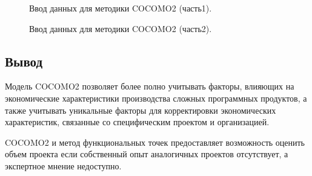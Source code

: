 \documentclass[a4paper,14pt]{article}
\begin{document}
\begin{figure}[!h]
         \caption{Ввод данных для методики COCOMO2 (часть1).}
    \label{fig:input1}
\end{figure}

\begin{figure}[!h]
	     \caption{Ввод данных для методики COCOMO2 (часть2).}
	\label{fig:input2}
\end{figure}

\newpage
\subsection*{Вывод}

Модель COCOMO2 позволяет более полно учитывать факторы, влияющих на экономические характеристики производства сложных программных продуктов, а также учитывать уникальные факторы для корректировки экономических характеристик, связанные со специфическим проектом и организацией.

COCOMO2 и метод функциональных точек предоставляет возможность оценить объем проекта если собственный опыт аналогичных проектов отсутствует, а экспертное мнение недоступно.
\end{document}
